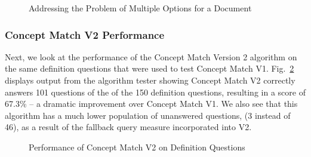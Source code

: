 \begin{figure}
\centering
\vspace{1.0in}
\caption{Addressing the Problem of Multiple Options for a Document}
\label{fig:concept_match_v2_multiple_concept_docs}
\end{figure}

\subsubsection{Concept Match V2 Performance}

Next, we look at the performance of the Concept Match Version 2 algorithm on the same definition questions that were used to test Concept Match V1.  Fig.~\ref{fig:concept_match_v2_training_set_results_def} displays output from the algorithm tester showing Concept Match V2 correctly answers 101 questions of the of the 150 definition questions, resulting in a score of 67.3\% -- a dramatic improvement over Concept Match V1.  We also see that this algorithm has a much lower population of unanswered questions, (3 instead of 46), as a result of the fallback query measure incorporated into V2.



\begin{figure}
\centering
\vspace{1.0in}
\caption{Performance of Concept Match V2 on Definition Questions}
\label{fig:concept_match_v2_training_set_results_def}
\end{figure}


